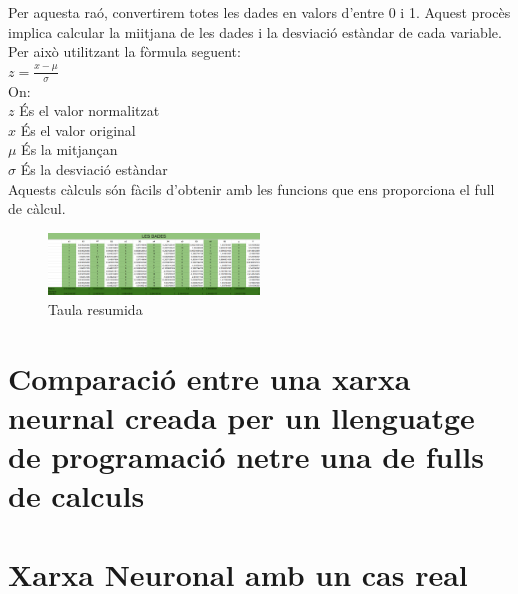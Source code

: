 Per aquesta raó, convertirem totes les dades en valors d'entre 0 i 1. Aquest procès implica calcular la miitjana de les dades i la desviació estàndar de cada variable. Per això utilitzant la fòrmula seguent:\\
$z = \frac{x - \mu}{\sigma}$\\

On:\\
$z$ És el valor normalitzat\\
$x$ És el valor original\\
$\mu$ És la mitjançan\\
$\sigma$ És la desviació estàndar\\

Aquests càlculs són fàcils d'obtenir amb les funcions que ens proporciona el full de càlcul.

\begin{figure}[H]
    \centering
    \includegraphics[width=0.5\textwidth]{./figures/Dades_normalitzades.png}
    \caption{Taula resumida}
\end{figure}

\section{Comparació entre una xarxa neurnal creada per un llenguatge de programació netre una de fulls de calculs}

\section{Xarxa Neuronal amb un cas real}\label{sec:12}
